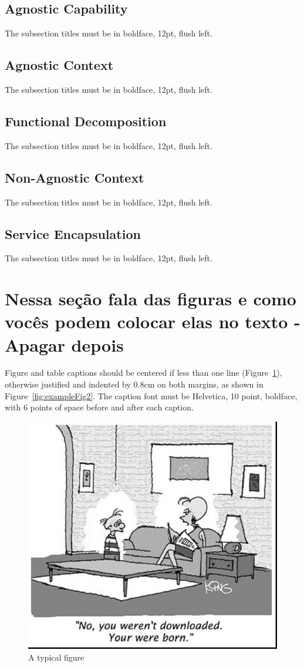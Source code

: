 \documentclass[12pt]{article}
\begin{document}
\subsection{Agnostic Capability}

The subsection titles must be in boldface, 12pt, flush left.

\subsection{Agnostic Context}

The subsection titles must be in boldface, 12pt, flush left.

\subsection{Functional Decomposition}

The subsection titles must be in boldface, 12pt, flush left.

\subsection{Non-Agnostic Context}

The subsection titles must be in boldface, 12pt, flush left.

\subsection{Service Encapsulation}

The subsection titles must be in boldface, 12pt, flush left.


\section{Nessa seção fala das figuras e como vocês podem colocar elas no texto - Apagar depois}\label{sec:figs}


Figure and table captions should be centered if less than one line
(Figure~\ref{fig:exampleFig1}), otherwise justified and indented by 0.8cm on
both margins, as shown in Figure~\ref{fig:exampleFig2}. The caption font must
be Helvetica, 10 point, boldface, with 6 points of space before and after each
caption.

\begin{figure}[ht]
\centering
\includegraphics[width=.5\textwidth]{fig1.jpg}
\caption{A typical figure}
\label{fig:exampleFig1}
\end{figure}
\end{document}
